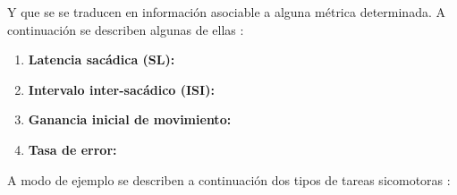 \documentclass[../main.tex]{subfiles}
\begin{document}
		 Y que se se traducen en información asociable a alguna métrica determinada. A continuación se describen algunas de ellas \cite{article:tests_1, article:tests_2}:
		 \begin{enumerate}
		 	\item \textbf{Latencia sacádica (SL):}

		 	\item \textbf{Intervalo inter-sacádico (ISI):}
		 	
		 	\item \textbf{Ganancia inicial de movimiento:}
		 	
		 	\item \textbf{Tasa de error:}

		 \end{enumerate} 

		 A modo de ejemplo se describen a continuación dos tipos de tareas sicomotoras \cite{article:tests_1, article:tests_2}:
\end{document}
